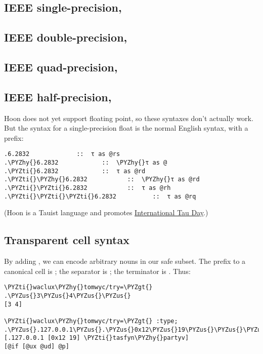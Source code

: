 \subsection{IEEE single-precision, }

\subsection{IEEE double-precision, }

\subsection{IEEE quad-precision, }

\subsection{IEEE half-precision, }

Hoon does not yet support floating point, so these syntaxes
don't actually work.  But the syntax for a single-precision
float is the normal English syntax, with a  prefix:

\begin{framed_shaded}
\begin{Verbatim}[fontsize=\relsize{-2.5},fontseries=b,commandchars=\\\{\}]
.6.2832             ::  τ as @rs
.\PYZhy{}6.2832            ::  \PYZhy{}τ as @
.\PYZti{}6.2832            ::  τ as @rd
.\PYZti{}\PYZhy{}6.2832           ::  \PYZhy{}τ as @rd
.\PYZti{}\PYZti{}6.2832           ::  τ as @rh
.\PYZti{}\PYZti{}\PYZti{}6.2832          ::  τ as @rq
\end{Verbatim}
\end{framed_shaded}

(Hoon is a Tauist language and promotes \href{http://tauday.com/}{International Tau Day}.)

\subsection{Transparent cell syntax}

By adding \kode{\_}, we can encode arbitrary nouns in our safe subset.
The prefix to a canonical cell is ; the separator is \kode{\_};
the terminator is \kode{\_\_}.  Thus:

\begin{framed_shaded}
\begin{Verbatim}[fontsize=\relsize{-2.5},fontseries=b,commandchars=\\\{\}]
\PYZti{}waclux\PYZhy{}tomwyc/try=\PYZgt{} .\PYZus{}3\PYZus{}4\PYZus{}\PYZus{}
[3 4]

\PYZti{}waclux\PYZhy{}tomwyc/try=\PYZgt{} :type; .\PYZus{}.127.0.0.1\PYZus{}.\PYZus{}0x12\PYZus{}19\PYZus{}\PYZus{}\PYZus{}\PYZti{}tasfyn\PYZhy{}partyv\PYZus{}\PYZus{}
[.127.0.0.1 [0x12 19] \PYZti{}tasfyn\PYZhy{}partyv]
[@if [@ux @ud] @p]
\end{Verbatim}
\end{framed_shaded}

